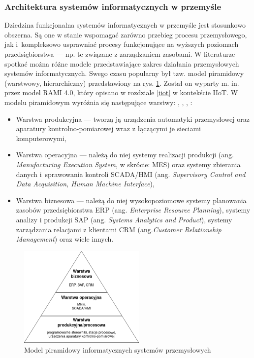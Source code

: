 \documentclass[a4paper, 12pt, twoside]{article}
\begin{document}
\subsubsection{Architektura systemów informatycznych w przemyśle}\label{arch-przemysl}

Dziedzina funkcjonalna systemów informatycznych w przemyśle jest stosunkowo obszerna.
Są one w stanie wspomagać zarówno przebieg procesu przemysłowego,
jak i~kompleksowo usprawniać procesy funkcjonujące na wyższych poziomach przedsiębiorstwa
--- np. te związane z zarządzaniem zasobami. W literaturze spotkać można różne
modele przedstawiające zakres działania przemysłowych systemów informatycznych.
Swego czasu popularny był tzw. model piramidowy (warstwowy, hierarchiczny)
przedstawiony na rys. \ref{fig:piramida}. Został on wyparty m. in.
przez model RAMI 4.0, który opisano w rozdziale \ref{iiot} w kontekście IIoT.
W modelu piramidowym wyróżnia się następujące warstwy:
\cite{systemy-automatyki-przemyslowej}, \cite{isp}, \cite{iiot-cyber-manufacturing-systems}, \cite{intro-to-iot}:
\begin{itemize}
      \itemsep0em
      \item Warstwa produkcyjna --- tworzą ją urządzenia automatyki przemysłowej
            oraz aparatury kontrolno-pomiarowej wraz z łączącymi je sieciami komputerowymi,
      \item Warstwa operacyjna --- należą do niej systemy realizacji produkcji
            (ang. \emph{Manufacturing Execution System}, w skrócie: MES) oraz systemy
            zbierania danych i~sprawowania kontroli SCADA/HMI
            (ang. \emph{Supervisory Control and Data Acquisition, Human Machine Interface}),
      \item Warstwa biznesowa --- należą do niej wysokopoziomowe systemy planowania
            zasobów przedsiębiorstwa ERP (ang. \emph{Enterprise Resource Planning}),
            systemy analizy i produkcji SAP (ang. \emph{Systems Analytics and Product}),
            systemy zarządzania relacjami z klientami CRM (ang.\emph{Customer Relationship Management})
            oraz wiele innych.
\end{itemize}

\begin{figure}[h]
      \centering
      \includegraphics[width=0.55\textwidth]{piramida.png}
      \caption{Model piramidowy informatycznych systemów przemysłowych}
      \label{fig:piramida}
\end{figure}
\end{document}
